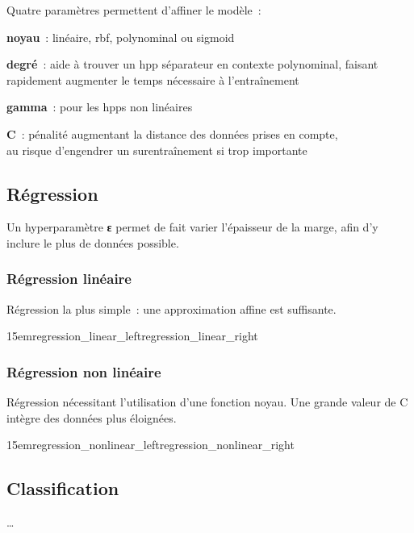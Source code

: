 Quatre paramètres permettent d’affiner le modèle :
\begin{itmz}
\item{\textbf{noyau} : linéaire, \gls{rbf}, polynominal ou \gls{sigmoid}}
\item{\textbf{degré} : aide à trouver un \gls{hpp} séparateur en contexte polynominal,
faisant rapidement augmenter le temps nécessaire à l’entraînement}
\item{\textbf{gamma} : pour les \glspl{hpp} non linéaires}
\item{\textbf{C} : pénalité augmentant la distance des données prises en compte,\\
au risque d’engendrer un surentraînement si trop importante}
\end{itmz}

\pagebreak

\subsection{Régression}

Un hyperparamètre \textbf{ε} permet de fait varier l’épaisseur de la marge,
afin d’y inclure le plus de données possible.

\subsubsection{Régression linéaire}

Régression la plus simple : une approximation affine est suffisante.

{15em}{regression_linear_left}{regression_linear_right}

\subsubsection{Régression non linéaire}

Régression nécessitant l’utilisation d’une fonction noyau.
Une grande valeur de C intègre des données plus éloignées.

{15em}{regression_nonlinear_left}{regression_nonlinear_right}

\subsection{Classification}

…

